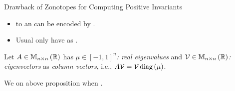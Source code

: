

\begin{frame}{Drawback of Zonotopes for Computing Positive Invariants}
\begin{itemize}
\item {} to an  can be
encoded by .
\item Usual  only have
 as .
\end{itemize}
%
\pause
%
\begin{block}{}
{\small
Let \emph{$A\in\mathbb{M}_{n\times n}\left(\mathbb{R}\right)$} has \emph{$\mu\in[-1,1]^n$: real
eigenvalues} and \emph{$\mathcal{V}\in\mathbb{M}_{n\times n}\left(\mathbb{R}\right)$: eigenvectors} as
\emph{column vectors}, i.e., \emph{$A\mathcal{V} = \mathcal{V}\operatorname{diag}\left(\mu\right)$}.
}
\vspace{-1em}
\end{block}
%
\negemph{*} We  on above proposition when .
\end{frame}



